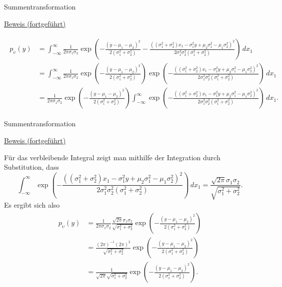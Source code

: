 \documentclass[
  8pt,
  ignorenonframetext,
]{beamer}
\newcommand{\ups}{\upsilon}
\begin{document}
\begin{frame}{Summentransformation}
\protect\hypertarget{summentransformation-3}{}
\footnotesize

\underline{Beweis (fortgeführt)}

\tiny

\begin{align}
\begin{split}
p_\ups(y)
& = \int_{-\infty}^\infty
    \frac{1}{2 \pi \sigma_1\sigma_2}
    \exp\left(
    -\frac{(y - \mu_1 - \mu_2)^2}
      {2(\sigma_1^2 + \sigma_2^2)}
    -\frac{((\sigma_1^2 + \sigma_2^2)x_1 -\sigma_1^2y + \mu_2 \sigma_1^2 - \mu_1 \sigma_2^2)^2}
      {2\sigma_1^2\sigma_2^2(\sigma_1^2 + \sigma_2^2)}
    \right)
    \,dx_1
\\
& = \int_{-\infty}^\infty
    \frac{1}{2 \pi \sigma_1\sigma_2}
    \exp\left(
    -\frac{(y - \mu_1 - \mu_2)^2}
      {2(\sigma_1^2 + \sigma_2^2)}
    \right)
    \exp\left(
    -\frac{((\sigma_1^2 + \sigma_2^2)x_1 -\sigma_1^2y + \mu_2 \sigma_1^2 - \mu_1 \sigma_2^2)^2}
      {2\sigma_1^2\sigma_2^2(\sigma_1^2 + \sigma_2^2)}
    \right)
    \,dx_1
\\
& = \frac{1}{2 \pi \sigma_1\sigma_2}
    \exp\left(
    -\frac{(y - \mu_1 - \mu_2)^2}
      {2(\sigma_1^2 + \sigma_2^2)}
    \right)
    \int_{-\infty}^\infty
    \exp\left(
    -\frac{((\sigma_1^2 + \sigma_2^2)x_1 -\sigma_1^2y + \mu_2 \sigma_1^2 - \mu_1 \sigma_2^2)^2}
      {2\sigma_1^2\sigma_2^2(\sigma_1^2 + \sigma_2^2)}
    \right)
    \,dx_1.
\end{split}
\end{align}
\end{frame}

\begin{frame}{Summentransformation}
\protect\hypertarget{summentransformation-4}{}
\footnotesize

\underline{Beweis (fortgeführt)}

Für das verbleibende Integral zeigt man mithilfe der Integration durch
Substitution, dass \begin{equation}
\int_{-\infty}^\infty
    \exp\left(
    -\frac{((\sigma_1^2 + \sigma_2^2)x_1 -\sigma_1^2y + \mu_2 \sigma_1^2 - \mu_1 \sigma_2^2)^2}
      {2\sigma_1^2\sigma_2^2(\sigma_1^2 + \sigma_2^2)}
    \right)
    \,dx_1
= \frac{\sqrt{2\pi}\sigma_1\sigma_2}{\sqrt{\sigma_1^2 + \sigma_2^2}}.
\end{equation} Es ergibt sich also \begin{align}
\begin{split}
p_\ups(y)
& = \frac{1}{2 \pi \sigma_1\sigma_2}
    \frac{\sqrt{2\pi}\sigma_1\sigma_2}{\sqrt{\sigma_1^2 + \sigma_2^2}}
    \exp\left(
    -\frac{(y - \mu_1 - \mu_2)^2}
      {2(\sigma_1^2 + \sigma_2^2)}
    \right)
\\
& = \frac{(2\pi)^{-1}(2\pi)^2}{\sqrt{\sigma_1^2 + \sigma_2^2}}
    \exp\left(
    -\frac{(y - \mu_1 - \mu_2)^2}
      {2(\sigma_1^2 + \sigma_2^2)}
    \right)
\\
& = \frac{1}{\sqrt{2\pi}\sqrt{\sigma_1^2 + \sigma_2^2}}
    \exp\left(
    -\frac{(y - \mu_1 - \mu_2)^2}
      {2(\sigma_1^2 + \sigma_2^2)}
    \right).
\end{split}
\end{align}
\end{frame}
\end{document}

